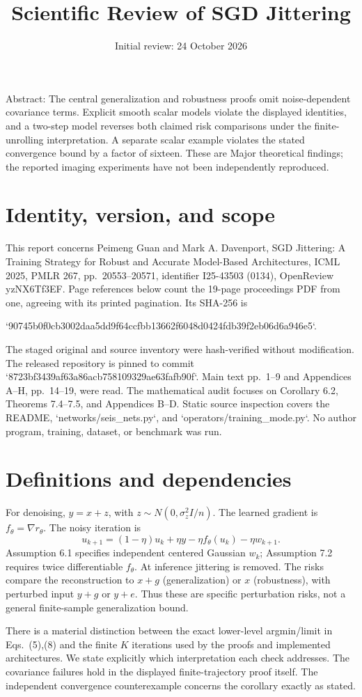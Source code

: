 \documentclass[10pt]{article}
\title{Scientific Review of SGD Jittering}
\author{}
\date{Initial review: 24 October 2026}
\begin{document}
\maketitle
Abstract: The central generalization and robustness proofs omit noise-dependent covariance terms. Explicit smooth scalar models violate the displayed identities, and a two-step model reverses both claimed risk comparisons under the finite-unrolling interpretation. A separate scalar example violates the stated convergence bound by a factor of sixteen. These are Major theoretical findings; the reported imaging experiments have not been independently reproduced.\par
\section*{Identity, version, and scope}
This report concerns Peimeng Guan and Mark A. Davenport, SGD Jittering: A Training Strategy for Robust and Accurate Model-Based Architectures, ICML 2025, PMLR 267, pp. 20553–20571, identifier I25-43503 (0134), OpenReview yzNX6Tf3EF. Page references below count the 19-page proceedings PDF from one, agreeing with its printed pagination. Its SHA-256 is\par
`90745b0f0cb3002daa5dd9f64ccfbb13662f6048d0424fdb39f2eb06d6a946e5`.\par
The staged original and source inventory were hash-verified without modification. The released repository is pinned to commit `8723bf3439af63a86acb758109329ae63fafb90f`. Main text pp. 1–9 and Appendices A–H, pp. 14–19, were read. The mathematical audit focuses on Corollary 6.2, Theorems 7.4–7.5, and Appendices B–D. Static source inspection covers the README, `networks/seis\_nets.py`, and `operators/training\_mode.py`. No author program, training, dataset, or benchmark was run.\par
\section*{Definitions and dependencies}
For denoising, \(y=x+z\), with \(z\sim N(0,\sigma_z^2 I/n)\). The learned gradient is \(f_\theta=\nabla r_\theta\). The noisy iteration is \[u_{k+1}=(1-\eta)u_k+\eta y-\eta f_\theta(u_k)-\eta w_{k+1}.\] Assumption 6.1 specifies independent centered Gaussian \(w_k\); Assumption 7.2 requires twice differentiable \(f_\theta\). At inference jittering is removed. The risks compare the reconstruction to \(x+g\) (generalization) or \(x\) (robustness), with perturbed input \(y+g\) or \(y+e\). Thus these are specific perturbation risks, not a general finite-sample generalization bound.\par
There is a material distinction between the exact lower-level argmin/limit in Eqs. (5),(8) and the finite \(K\) iterations used by the proofs and implemented architectures. We state explicitly which interpretation each check addresses. The covariance failures hold in the displayed finite-trajectory proof itself. The independent convergence counterexample concerns the corollary exactly as stated.\par
\end{document}
